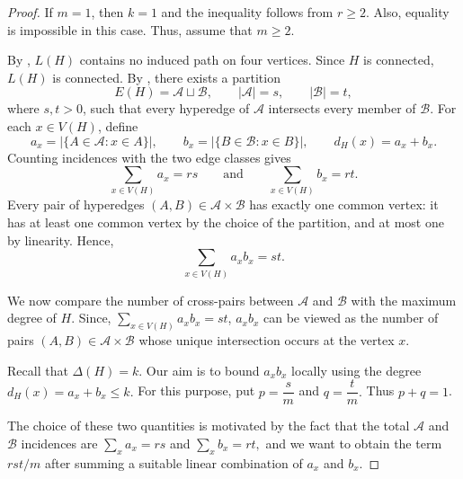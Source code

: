 \documentclass[11pt,a4paper]{article}
\theoremstyle{definition}
\theoremstyle{remark}
\begin{document}
\begin{proof}
If $m=1$, then $k=1$ and the inequality follows from $r\geq 2$. Also,
equality is impossible in this case. Thus, assume that $m\geq 2$.

By , $L(H)$ contains no induced path on four
vertices. Since $H$ is connected, $L(H)$ is connected. By
, there exists a partition
$$
E(H)=\mathcal{A}\sqcup\mathcal{B},
\qquad
|\mathcal{A}|=s,
\qquad
|\mathcal{B}|=t,
$$
where $s,t>0$, such that every hyperedge of $\mathcal{A}$ intersects every
member of $\mathcal{B}$. For each $x\in V(H)$, define
$$
a_x=|\{A\in\mathcal{A}:x\in A\}|,
\qquad
b_x=|\{B\in\mathcal{B}:x\in B\}|,
\qquad
d_H(x)=a_x+b_x.
$$
Counting incidences with the two edge classes gives
$$
\sum_{x\in V(H)}a_x=rs
\qquad\text{and}\qquad
\sum_{x\in V(H)}b_x=rt.
$$
Every pair of hyperedges $(A,B)\in\mathcal{A}\times\mathcal{B}$ has exactly one
common vertex: it has at least one common vertex by the choice of the
partition, and at most one by linearity. Hence,
$$
\sum_{x\in V(H)}a_xb_x=st.
$$

We now compare the number of cross-pairs between $\mathcal{A}$ and
$\mathcal{B}$ with the maximum degree of $H$.
Since, $\sum_{x\in V(H)}a_xb_x=st$, $a_xb_x$ can be viewed as the number of pairs
$(A,B)\in\mathcal{A}\times\mathcal{B}$ whose unique intersection occurs
at the vertex $x$.

Recall that $\Delta(H) = k$. Our aim is to bound $a_xb_x$ locally using the degree
    $d_H(x)=a_x+b_x\leq k.$
For this purpose, put
    $p=\dfrac{s}{m}$ and $q=\dfrac{t}{m}.$
Thus $p+q=1$. 

The choice of these two quantities is motivated by the fact
that the total $\mathcal{A}$ and $\mathcal{B}$ incidences are
    $\sum_x a_x=rs$ and $\sum_x b_x=rt,$
and we want to obtain the term $rst/m$ after summing a suitable linear
combination of $a_x$ and $b_x$.


\end{proof}
\end{document}
